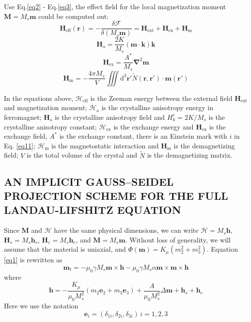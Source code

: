 \documentclass{article}
\begin{document}
Use Eq.\eqref{eq2} - Eq.\eqref{eq3}, the effect field for the local magnetization moment $\bm{M}=M_s\bm{m}$ could be computed out:
\begin{equation}
\bm{H}_\text{eff}\left(\bm{r}\right)=-\frac{\delta \mathcal{F}}{\delta \left(M_s\bm{m}\right)}=\bm{H}_\text{ext}+\bm{H}_\text{ex}+\bm{H}_\text{m}\label{eq13}
\end{equation}
\begin{equation}
\bm{H}_\text{a}=\frac{2K}{M_s}\left(\bm{m}\cdot \bm{k}\right)\bm{k}\label{eq14}
\end{equation}
\begin{equation}
\bm{H}_\text{ex}=\frac{A^*}{M_s}\bm{\nabla}^2\bm{m}\label{eq15}
\end{equation}
\begin{equation}
\bm{H}_\text{m}=-\frac{4\pi M_s}{V}\iiint \mathrm{d}^3\bm{r}'\tilde{N}\left(\bm{r},\bm{r}'\right)\cdot \bm{m}\left(\bm{r}'\right)\label{eq16}
\end{equation}

In the equations above, $\mathcal{H}_\text{eff}$ is the Zeeman energy between the external field $\bm{H}_\text{ext}$ and magnetization moment; $\mathcal{H}_\text{a}$ is the crystalline anisotropy energy in ferromagnet; $\bm{H}_\text{a}$ is the crystalline anisotropy field and $H_k^c=2K/M_s$ is the crystalline anisotropy constant; $\mathcal{H}_\text{ex}$ is the exchange energy and $\bm{H}_\text{ex}$ is the exchange field, $A^*$ is the exchange constant, there is an Einstein mark with $i$ in Eq. \eqref{eq11}; $\mathcal{H}_\text{m}$ is the magnetostatic interaction and $\bm{H}_\text{m}$ is the demagnetizing field; $V$ is the total volume of the crystal and $\tilde{N}$ is the demagnetizing matrix.
\subsection{AN IMPLICIT GAUSS–SEIDEL PROJECTION SCHEME FOR THE FULL LANDAU-LIFSHITZ EQUATION}
Since $\bm{M}$ and $\mathcal{H}$ have the same physical dimensions, we can write $\mathcal{H}=M_s\bm{h}$, $\bm{H}_s=M_s\bm{h}_s$, $\bm{H}_e=M_s\bm{h}_e$, and $\bm{M}=M_s\bm{m}$. Without loss of generality, we will assume that the material is uniaxial, and $\Phi\left(\bm{m}\right)=K_{\mu}\left(m_2^2+m_3^2\right)$. Equation \eqref{eq1} is rewritten as
\begin{equation}
\bm{m}_t=-\mu_{0}\gamma M_s\bm{m}\times\bm{h}-\mu_0\gamma M_s\alpha \bm{m}\times \bm{m}\times\bm{h}
\end{equation}
where
\begin{equation}
\bm{h}=-\frac{K_\mu}{\mu_0 M_s^2}\left(m_2\bm{e}_2+m_3\bm{e}_3\right)+\frac{A}{\mu_0 M_s^2}\Delta \bm{m}+\bm{h}_s+\bm{h}_e
\end{equation}
Here we use the notation
\[\bm{e}_i=\left(\delta_{1i},\delta_{2i},\delta_{3i}\right)\, i=1,2,3\]
\end{document}
